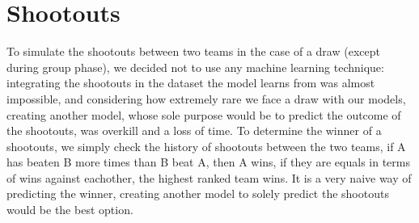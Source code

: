 \newpage
\section{Shootouts}
To simulate the shootouts between two teams in the case of a draw (except during group phase), we decided not to use any machine learning technique: integrating the shootouts in the dataset the model learns from was almost impossible, and considering how extremely rare we face a draw with our models, creating another model, whose sole purpose would be to predict the outcome of the shootouts, was overkill and a loss of time.
To determine the winner of a shootouts, we simply check the history of shootouts between the two teams, if A has beaten B more times than B beat A, then A wins, if they are equals in terms of wins against eachother, the highest ranked team wins.
It is a very naive way of predicting the winner, creating another model to solely predict the shootouts would be the best option.
